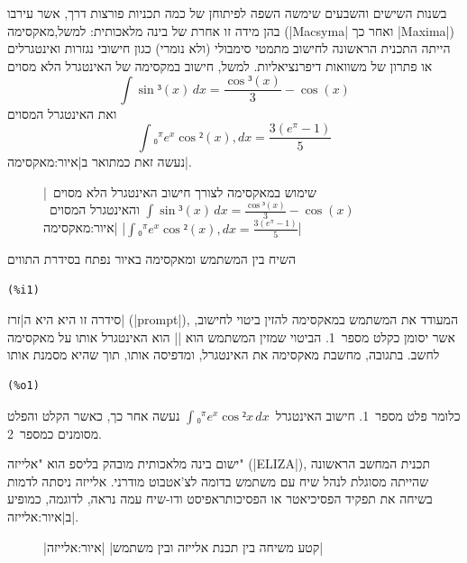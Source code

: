 בשנות השישים והשבעים שימשה השפה לפיתוחן של כמה תכניות פורצות דרך, אשר עירבו בהן
מידה זו אחרת של בינה מלאכותית: למשל,מאקסימה (\E|Macsyma| ואחר כך \E|Maxima|)
הייתה התכנית הראשונה לחישוב מתמטי סימבולי (ולא נומרי) כגון חישובי נגזרות
ואינטגרלים או פתרון של משוואות דיפרנציאליות. למשל, חישוב במקסימה של האינטגרל
הלא מסוים \[
  ∫\sin³(x)\, dx=\frac{\cos³(x)}3- \cos(x)
\]
ואת האינטגרל המסוים \[
  ∫₀^π e^x\cos²(x),dx=\frac{3 (e^π-1)}{5}
\] נעשה זאת כמתואר ב|איור:מאקסימה|.

\begin{figure}[H]
|שימוש במאקסימה לצורך חישוב האינטגרל הלא
מסוים~$∫\sin³(x)\,dx=\frac{\cos³(x)}3-\cos(x)$ והאינטגרל
המסוים~$∫₀^π e^x\cos²(x),dx=\frac{3(e^π-1)}{5}$|
|איור:מאקסימה|
\begin{LTR}
  
\end{LTR}
\end{figure}
השיח בין המשתמש ומאקסימה באיור נפתח בסידרת התווים
\begin{LTR}
\begin{lstlisting}[style=interaction,backgroundcolor=\color{white}]
(%i1)
\end{lstlisting}
\end{LTR}
סידרה זו היא היא ה\ע|זרז| (\E|prompt|), המעודד את המשתמש במאקסימה להזין ביטוי
לחישוב, אשר יסומן כקלט מספר~1. הביטוי שמזין המשתמש הוא
\E|| הוא האינטגרל אותו על מאקסימה לחשב. בתגובה,
מחשבת מאקסימה את האינטגרל, ומדפיסה אותו, תוך שהיא מסמנת אותו
\begin{LTR}
\begin{lstlisting}[style=interaction,backgroundcolor=\color{white}]
(%o1)
\end{lstlisting}
\end{LTR}
 כלומר פלט מספר~1. חישוב האינטגרל~$∫₀^πe^x\cos²x\,dx$ נעשה אחר כך, כאשר הקלט
 והפלט מסומנים כמספר~2.

ישום בינה מלאכותית מובהק בליספ הוא "אלייזה" (\E|ELIZA|), תכנית המחשב הראשונה
שהייתה מסוגלת לנהל שיח עם משתמש בדומה לצ'אטבוט מודרני. אלייזה ניסתה לדמות בשיחה
את תפקיד הפסיכיאטר או הפסיכותראפיסט ודו-שיח עמה נראה, לדוגמה, כמופיע
ב|איור:אלייזה|.

\begin{figure}
|קטע משיחה בין תכנת אלייזה ובין משתמש|
|איור:אלייזה|
\begin{LTR} \scriptsize
  
\end{LTR}
\end{figure}

